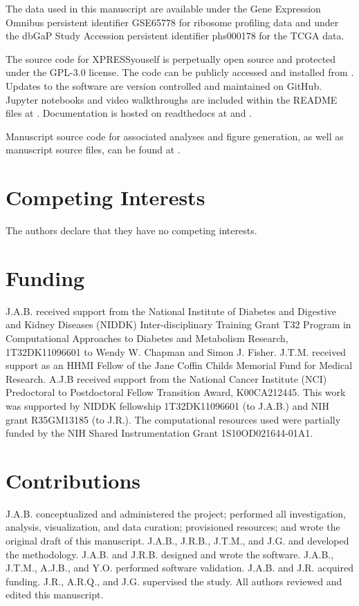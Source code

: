\documentclass[10pt, oneside]{article}
\begin{document}
\begin{multicols}{2}
The data used in this manuscript are available under the Gene Expression Omnibus persistent identifier GSE65778 \cite{isrib_geo} for ribosome profiling data and under the dbGaP Study Accession persistent identifier phs000178 \cite{tcga_data} for the TCGA data. \par

The source code for XPRESSyouself is perpetually open source and protected under the GPL-3.0 license. The code can be publicly accessed and installed from \cite{xpressyourself}. Updates to the software are version controlled and maintained on GitHub. Jupyter notebooks and video walkthroughs are included within the README files at \cite{xpressyourself}. Documentation is hosted on readthedocs \cite{readthedocs} at \cite{xpresspipe_docs} and \cite{xpressplot_docs}. \par

Manuscript source code for associated analyses and figure generation, as well as manuscript source files, can be found at \cite{manuscript}.

\section*{Competing Interests}
The authors declare that they have no competing interests.

\section*{Funding}
J.A.B. received support from the National Institute of Diabetes and Digestive and Kidney Diseases (NIDDK) Inter-disciplinary Training Grant T32 Program in Computational Approaches to Diabetes and Metabolism Research, 1T32DK11096601 to Wendy W. Chapman and Simon J. Fisher. J.T.M. received support as an HHMI Fellow of the Jane Coffin Childs Memorial Fund for Medical Research. A.J.B received support from the National Cancer Institute (NCI) Predoctoral to Postdoctoral Fellow Transition Award, K00CA212445. This work was supported by NIDDK fellowship 1T32DK11096601 (to J.A.B.) and NIH grant R35GM13185 (to J.R.). The computational resources used were partially funded by the NIH Shared Instrumentation Grant 1S10OD021644-01A1.

\section*{Contributions}
J.A.B. conceptualized and administered the project; performed all investigation, analysis, visualization, and data curation; provisioned resources; and wrote the original draft of this manuscript. J.A.B., J.R.B., J.T.M., and J.G. and developed the methodology. J.A.B. and J.R.B. designed and wrote the software. J.A.B., J.T.M., A.J.B., and Y.O. performed software validation. J.A.B. and J.R. acquired funding. J.R., A.R.Q., and J.G. supervised the study. All authors reviewed and edited this manuscript.


\end{multicols}
\end{document}
